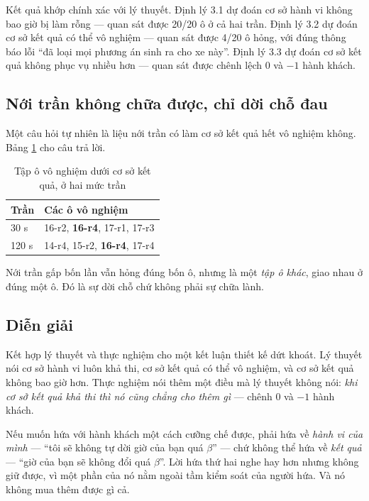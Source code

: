 Kết quả khớp chính xác với lý thuyết. Định lý 3.1 dự đoán cơ sở hành vi không bao giờ bị làm
rỗng --- quan sát được 20/20 ô ở cả hai trần. Định lý 3.2 dự đoán cơ sở kết quả có thể vô nghiệm
--- quan sát được 4/20 ô hỏng, với đúng thông báo lỗi ``đã loại mọi phương án sinh ra cho xe
này''. Định lý 3.3 dự đoán cơ sở kết quả không phục vụ nhiều hơn --- quan sát được chênh lệch 0
và $-1$ hành khách.

\subsection{Nới trần không chữa được, chỉ dời chỗ đau}

Một câu hỏi tự nhiên là liệu nới trần có làm cơ sở kết quả hết vô nghiệm không. Bảng
\ref{bang:doicho} cho câu trả lời.

\begin{table}[htbp]
\centering
\caption{Tập ô vô nghiệm dưới cơ sở kết quả, ở hai mức trần}
\label{bang:doicho}
\small
\begin{tabular}{@{}ll@{}}
\toprule
\textbf{Trần} & \textbf{Các ô vô nghiệm}\\
\midrule
30 s & 16-r2, \textbf{16-r4}, 17-r1, 17-r3\\
120 s & 14-r4, 15-r2, \textbf{16-r4}, 17-r4\\
\bottomrule
\end{tabular}
\end{table}

Nới trần gấp bốn lần vẫn hỏng đúng bốn ô, nhưng là một \emph{tập ô khác}, giao nhau ở đúng một
ô. Đó là sự dời chỗ chứ không phải sự chữa lành.

\subsection{Diễn giải}

Kết hợp lý thuyết và thực nghiệm cho một kết luận thiết kế dứt khoát. Lý thuyết nói cơ sở hành
vi luôn khả thi, cơ sở kết quả có thể vô nghiệm, và cơ sở kết quả không bao giờ hơn. Thực nghiệm
nói thêm một điều mà lý thuyết không nói: \emph{khi cơ sở kết quả khả thi thì nó cũng chẳng cho
thêm gì} --- chênh 0 và $-1$ hành khách.

\begin{khungy}
Nếu muốn hứa với hành khách một cách cưỡng chế được, phải hứa về \emph{hành vi của mình} ---
``tôi sẽ không tự dời giờ của bạn quá $\beta$'' --- chứ không thể hứa về \emph{kết quả} ---
``giờ của bạn sẽ không đổi quá $\beta$''. Lời hứa thứ hai nghe hay hơn nhưng không giữ được, vì
một phần của nó nằm ngoài tầm kiểm soát của người hứa. Và nó không mua thêm được gì cả.
\end{khungy}

